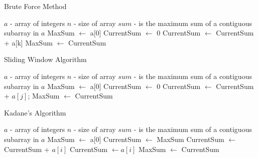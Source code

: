 \documentclass[10pt]{article}
\begin{document}
\begin{fullwidth}[width=\linewidth+4cm,leftmargin=-2cm,rightmargin=-2cm] 



\begin{algorithm}[H]
  \caption{Brute Force Method}
  \begin{algorithmic}[1]
    \Require $a$ - array of integers
    \Require $n$ - size of array
    \Ensure $sum$ - is the maximum sum of a contiguous subarray in $a$
      \State MaxSum $\gets$ a[0] 
        \State CurrentSum $\gets$ 0    
          \State CurrentSum $\gets$ CurrentSum + a[k] 
          \EndFor
            \State MaxSum $\gets$ CurrentSum 
          \EndIf
        \EndFor
      \EndFor
    \EndProcedure
  \end{algorithmic}
\end{algorithm}

\begin{algorithm}[H]
  \caption{Sliding Window Algorithm}
  \begin{algorithmic}[1]
    \Require $a$ - array of integers
    \Require $n$ - size of array
    \Ensure $sum$ - is the maximum sum of a contiguous subarray in $a$
      \State MaxSum $\gets$ a[0] 
        \State CurrentSum $\gets$ 0
          \State CurrentSum $\gets$ CurrentSum + $a[j]$;
          
          \State MaxSum $\gets$ CurrentSum
        \EndIf
        \EndFor
      \EndFor
    \EndProcedure
  \end{algorithmic}
\end{algorithm}


\begin{algorithm}[H]
  \caption{Kadane's Algorithm}
  \begin{algorithmic}[1]
    \Require $a$ - array of integers
    \Require $n$ - size of array
    \Ensure $sum$ - is the maximum sum of a contiguous subarray in $a$
      \State MaxSum $\gets$ a[0] 
      \State CurrentSum $\gets$   MaxSum
        \State CurrentSum $\gets$ CurrentSum + $a[i]$   
          
          \State CurrentSum $\gets a[i]$
        \EndIf
          
          \State MaxSum $\gets$ CurrentSum
        \EndIf
      \EndFor
    \EndProcedure
  \end{algorithmic}
\end{algorithm}





\end{fullwidth}
\end{document}
